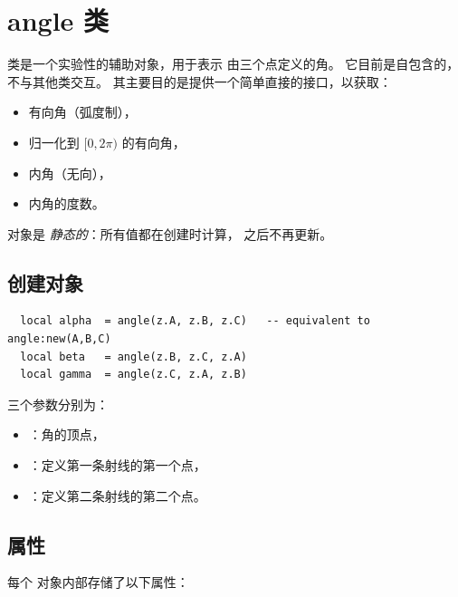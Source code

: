 \newpage
\section{angle 类}
\label{sec:class_angle}

 类是一个实验性的辅助对象，用于表示
由三个点定义的角。
它目前是自包含的，不与其他类交互。
其主要目的是提供一个简单直接的接口，以获取：

\begin{itemize}
  \item 有向角（弧度制），
  \item 归一化到 $[0, 2\pi)$ 的有向角，
  \item 内角（无向），
  \item 内角的度数。
\end{itemize}

 对象是 \emph{静态的}：所有值都在创建时计算，
之后不再更新。

\subsection{创建对象}
\label{ssub:method_angle_new}

\begin{verbatim}
  local alpha  = angle(z.A, z.B, z.C)   -- equivalent to angle:new(A,B,C)
  local beta   = angle(z.B, z.C, z.A)
  local gamma  = angle(z.C, z.A, z.B)
\end{verbatim}

三个参数分别为：
\begin{itemize}
  \item {}：角的顶点，
  \item {}：定义第一条射线的第一个点，
  \item {}：定义第二条射线的第二个点。
\end{itemize}

\subsection{属性}

每个  对象内部存储了以下属性：

